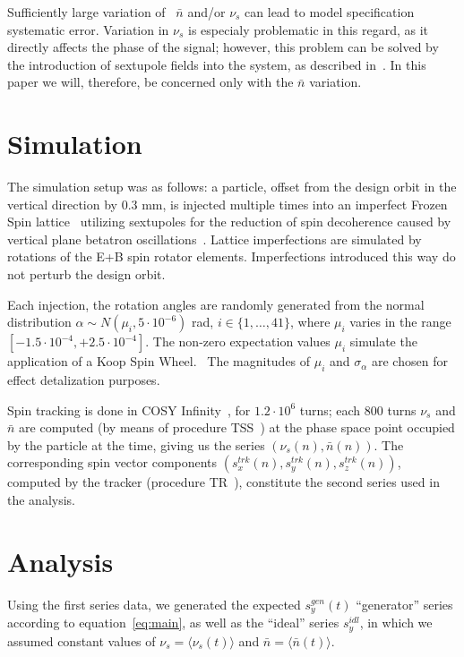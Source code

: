 \documentclass[a4paper]{jacow}
\newcommand{\avg}[1]{\langle {#1} \rangle}
\newcommand{\nbar}{\bar n}
\begin{document}
Sufficiently large variation of~ $\nbar$ and/or $\nu_s$ can lead to model specification systematic error.
Variation in $\nu_s$ is especialy problematic in this regard, as it directly affects the phase of the signal;
however, this problem can be solved by the introduction of sextupole fields into the system,
as described in~\cite{Aksentev:DecohIPAC19}. In this paper we will, therefore, be concerned only with the $\nbar$
variation.

\section{Simulation}
The simulation setup was as follows: a particle, offset from the design orbit in the vertical
direction by 0.3 mm, is injected multiple times into an imperfect
Frozen Spin lattice~\cite{Senichev:Lattices} utilizing sextupoles for
the reduction of spin decoherence caused by vertical plane betatron
oscillations~\cite{Aksentev:DecohIPAC19}.
Lattice imperfections are simulated by rotations of the E+B spin
rotator elements. Imperfections introduced this way do not perturb the design orbit.

Each injection, the rotation angles are randomly generated from the
normal distribution $\alpha\sim N(\mu_i, 5\cdot 10^{-6})$ rad, $i\in\{1,\dots,41\}$, where
$\mu_i$ varies in the range $[-1.5\cdot10^{-4}, +2.5\cdot10^{-4}]$. The non-zero expectation values $\mu_i$
simulate the application of a Koop Spin Wheel.~\cite{Koop:SW} The magnitudes of $\mu_i$ and $\sigma_{\alpha}$
are chosen for effect detalization purposes.

Spin tracking is done in COSY Infinity~\cite{COSYINF:Website}, for $1.2\cdot10^6$ turns; each 800 turns
$\nu_s$ and $\nbar$ are computed (by means of procedure TSS~\cite[p.~41]{COSYINF:BeamPhysMan}) at
the phase space point occupied by the particle at the time, giving us the series $(\nu_s(n), \nbar(n))$.
The corresponding spin vector components $(s_x^{trk}(n), s_y^{trk}(n), s_z^{trk}(n))$,
computed by the tracker (procedure
TR~\cite[p.~41]{COSYINF:BeamPhysMan}), 
constitute the second series used in the analysis.

\section{Analysis}
Using the first series data, we generated the expected $s_y^{gen}(t)$ ``generator'' series according to
equation~\eqref{eq:main}, as well as the ``ideal'' series $s_y^{idl}$, in which
we assumed constant values of $\nu_s = \avg{\nu_s(t)}$ and $\nbar
=\avg{\nbar(t)}$. 
\end{document}
